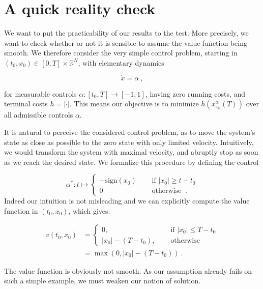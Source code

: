 
	\section{A quick reality check}
	
	\label{non-smooth}
	
	We want to put the practicability of our results to the test. More precisely, we want to check whether or not it is sensible to assume the value function being smooth. We therefore consider the very simple control problem, starting in $ (t_0, x_0) \in \left[ 0 , T \right] \times \mathbb{R}^N $, with elementary dynamics
	
	\begin{equation*}
		\dot{x} = \alpha \ ,
	\end{equation*}
	
	for measurable controls $ \alpha : \left[ t_0, T \right] \to \left[-1, 1\right] $, having zero running costs, and terminal costs $ h = \lvert \cdot \rvert $. This means our objective is to minimize $ h(x^{\alpha}_{x_0}(T)) $ over all admissible controls $ \alpha $.
	
	It is natural to perceive the considered control problem, as to move the system's state as close as possible to the zero state with only limited velocity. Intuitively, we would transform the system with maximal velocity, and abruptly stop as soon as we reach the desired state. We formalize this procedure by defining the control
	
	\begin{equation*}
		\alpha^{*} : t \mapsto \begin{cases}
		-\text{sign}(x_0) \quad &\text{ if } \lvert x_0 \rvert \geq t - t_0 \\
		0 \quad &\text{ otherwise } \ .
		\end{cases}
	\end{equation*}
	Indeed our intuition is not misleading and we can explicitly compute the value function in $ (t_0, x_0) $, which gives:
	
	\begin{align*}
		v(t_0, x_0) &= \begin{cases}
		0, \quad &\text{ if } |x_0| \leq T - t_0 \\
		|x_0| - (T - t_0), \quad &\text{ otherwise }
		\end{cases} \\
		&= \max(0, |x_0| - (T - t_0)) \ .
	\end{align*}
	
	The value function is obviously not smooth. As our assumption already fails on such a simple example, we must weaken our notion of solution.
	
